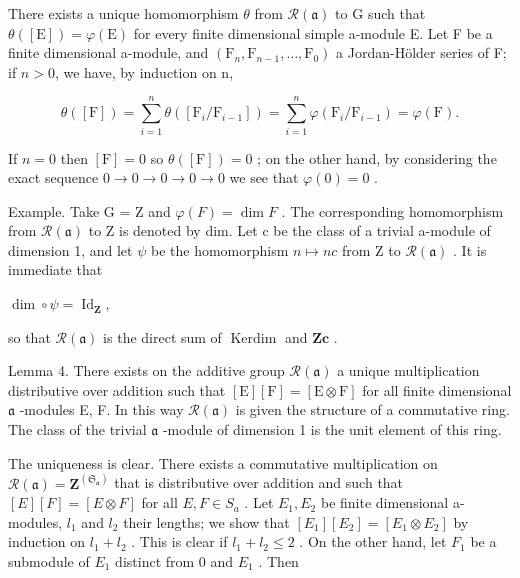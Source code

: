 There exists a unique homomorphism \(\theta\) from \(\mathcal{R}(\mathfrak{a})\) to G such that \(\theta([\mathrm{E}]) = \varphi(\mathrm{E})\) for every finite dimensional simple a-module E. Let F be a finite dimensional a-module, and \((\mathrm{F}_{n}, \mathrm{F}_{n-1}, \ldots, \mathrm{F}_{0})\) a Jordan-Hölder series of F; if \(n > 0\), we have, by induction on n,

\[
\theta ([ \mathrm{F} ]) = \sum_ {i = 1} ^ {n} \theta ([ \mathrm{F} _ {i} / \mathrm{F} _ {i - 1} ]) = \sum_ {i = 1} ^ {n} \varphi (\mathrm{F} _ {i} / \mathrm{F} _ {i - 1}) = \varphi (\mathrm{F}).
\]

If \(n = 0\) then \([\mathrm{F}] = 0\) so \(\theta([\mathrm{F}]) = 0\) ; on the other hand, by considering the exact sequence \(0 \longrightarrow 0 \longrightarrow 0 \longrightarrow 0 \longrightarrow 0\) we see that \(\varphi(0) = 0\) .

Example. Take G = Z and \(\varphi(F) = \dim F\) . The corresponding homomorphism from \(\mathcal{R}(\mathfrak{a})\) to Z is denoted by dim. Let c be the class of a trivial a-module of dimension 1, and let \(\psi\) be the homomorphism \(n \mapsto nc\) from Z to \(\mathcal{R}(\mathfrak{a})\) . It is immediate that

\(\dim \circ \psi = \operatorname{Id}_{\mathbf{Z}},\)

so that \(\mathcal{R}(\mathfrak{a})\) is the direct sum of \(\operatorname{Kerdim}\) and \(\mathbf{Zc}\) .

Lemma 4. There exists on the additive group \(\mathcal{R}(\mathfrak{a})\) a unique multiplication distributive over addition such that \([\mathrm{E}][\mathrm{F}] = [\mathrm{E}\otimes \mathrm{F}]\) for all finite dimensional \(\mathfrak{a}\) -modules E, F. In this way \(\mathcal{R}(\mathfrak{a})\) is given the structure of a commutative ring. The class of the trivial \(\mathfrak{a}\) -module of dimension 1 is the unit element of this ring.

The uniqueness is clear. There exists a commutative multiplication on \(\mathcal{R}(\mathfrak{a}) = \mathbf{Z}^{(\mathfrak{S}_{\mathfrak{a}})}\) that is distributive over addition and such that \([E][F] = [E \otimes F]\) for all \(E, F \in S_{a}\) . Let \(E_{1}, E_{2}\) be finite dimensional a-modules, \(l_{1}\) and \(l_{2}\) their lengths; we show that \([E_{1}][E_{2}] = [E_{1} \otimes E_{2}]\) by induction on \(l_{1} + l_{2}\) . This is clear if \(l_{1} + l_{2} \leq 2\) . On the other hand, let \(F_{1}\) be a submodule of \(E_{1}\) distinct from 0 and \(E_{1}\) . Then

